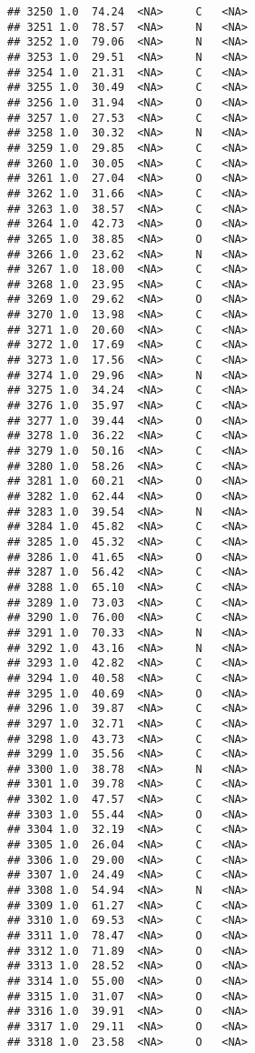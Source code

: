 \documentclass[
]{article}
\begin{document}
\begin{verbatim}
## 3250 1.0  74.24  <NA>     C   <NA>
## 3251 1.0  78.57  <NA>     N   <NA>
## 3252 1.0  79.06  <NA>     N   <NA>
## 3253 1.0  29.51  <NA>     N   <NA>
## 3254 1.0  21.31  <NA>     C   <NA>
## 3255 1.0  30.49  <NA>     C   <NA>
## 3256 1.0  31.94  <NA>     O   <NA>
## 3257 1.0  27.53  <NA>     C   <NA>
## 3258 1.0  30.32  <NA>     N   <NA>
## 3259 1.0  29.85  <NA>     C   <NA>
## 3260 1.0  30.05  <NA>     C   <NA>
## 3261 1.0  27.04  <NA>     O   <NA>
## 3262 1.0  31.66  <NA>     C   <NA>
## 3263 1.0  38.57  <NA>     C   <NA>
## 3264 1.0  42.73  <NA>     O   <NA>
## 3265 1.0  38.85  <NA>     O   <NA>
## 3266 1.0  23.62  <NA>     N   <NA>
## 3267 1.0  18.00  <NA>     C   <NA>
## 3268 1.0  23.95  <NA>     C   <NA>
## 3269 1.0  29.62  <NA>     O   <NA>
## 3270 1.0  13.98  <NA>     C   <NA>
## 3271 1.0  20.60  <NA>     C   <NA>
## 3272 1.0  17.69  <NA>     C   <NA>
## 3273 1.0  17.56  <NA>     C   <NA>
## 3274 1.0  29.96  <NA>     N   <NA>
## 3275 1.0  34.24  <NA>     C   <NA>
## 3276 1.0  35.97  <NA>     C   <NA>
## 3277 1.0  39.44  <NA>     O   <NA>
## 3278 1.0  36.22  <NA>     C   <NA>
## 3279 1.0  50.16  <NA>     C   <NA>
## 3280 1.0  58.26  <NA>     C   <NA>
## 3281 1.0  60.21  <NA>     O   <NA>
## 3282 1.0  62.44  <NA>     O   <NA>
## 3283 1.0  39.54  <NA>     N   <NA>
## 3284 1.0  45.82  <NA>     C   <NA>
## 3285 1.0  45.32  <NA>     C   <NA>
## 3286 1.0  41.65  <NA>     O   <NA>
## 3287 1.0  56.42  <NA>     C   <NA>
## 3288 1.0  65.10  <NA>     C   <NA>
## 3289 1.0  73.03  <NA>     C   <NA>
## 3290 1.0  76.00  <NA>     C   <NA>
## 3291 1.0  70.33  <NA>     N   <NA>
## 3292 1.0  43.16  <NA>     N   <NA>
## 3293 1.0  42.82  <NA>     C   <NA>
## 3294 1.0  40.58  <NA>     C   <NA>
## 3295 1.0  40.69  <NA>     O   <NA>
## 3296 1.0  39.87  <NA>     C   <NA>
## 3297 1.0  32.71  <NA>     C   <NA>
## 3298 1.0  43.73  <NA>     C   <NA>
## 3299 1.0  35.56  <NA>     C   <NA>
## 3300 1.0  38.78  <NA>     N   <NA>
## 3301 1.0  39.78  <NA>     C   <NA>
## 3302 1.0  47.57  <NA>     C   <NA>
## 3303 1.0  55.44  <NA>     O   <NA>
## 3304 1.0  32.19  <NA>     C   <NA>
## 3305 1.0  26.04  <NA>     C   <NA>
## 3306 1.0  29.00  <NA>     C   <NA>
## 3307 1.0  24.49  <NA>     C   <NA>
## 3308 1.0  54.94  <NA>     N   <NA>
## 3309 1.0  61.27  <NA>     C   <NA>
## 3310 1.0  69.53  <NA>     C   <NA>
## 3311 1.0  78.47  <NA>     O   <NA>
## 3312 1.0  71.89  <NA>     O   <NA>
## 3313 1.0  28.52  <NA>     O   <NA>
## 3314 1.0  55.00  <NA>     O   <NA>
## 3315 1.0  31.07  <NA>     O   <NA>
## 3316 1.0  39.91  <NA>     O   <NA>
## 3317 1.0  29.11  <NA>     O   <NA>
## 3318 1.0  23.58  <NA>     O   <NA>

\end{verbatim}
\end{document}
